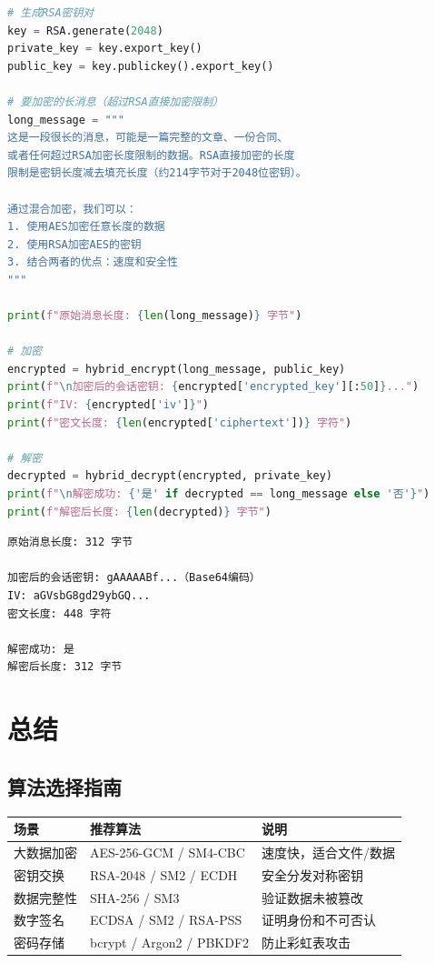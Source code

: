 \documentclass[12pt,a4paper]{article}
\begin{document}
\begin{lstlisting}[language=Python]
# 生成RSA密钥对
key = RSA.generate(2048)
private_key = key.export_key()
public_key = key.publickey().export_key()

# 要加密的长消息（超过RSA直接加密限制）
long_message = """
这是一段很长的消息，可能是一篇完整的文章、一份合同、
或者任何超过RSA加密长度限制的数据。RSA直接加密的长度
限制是密钥长度减去填充长度（约214字节对于2048位密钥）。

通过混合加密，我们可以：
1. 使用AES加密任意长度的数据
2. 使用RSA加密AES的密钥
3. 结合两者的优点：速度和安全性
"""

print(f"原始消息长度: {len(long_message)} 字节")

# 加密
encrypted = hybrid_encrypt(long_message, public_key)
print(f"\n加密后的会话密钥: {encrypted['encrypted_key'][:50]}...")
print(f"IV: {encrypted['iv']}")
print(f"密文长度: {len(encrypted['ciphertext'])} 字符")

# 解密
decrypted = hybrid_decrypt(encrypted, private_key)
print(f"\n解密成功: {'是' if decrypted == long_message else '否'}")
print(f"解密后长度: {len(decrypted)} 字节")
\end{lstlisting}

\begin{notebox}[运行结果]
\begin{verbatim}
原始消息长度: 312 字节

加密后的会话密钥: gAAAAABf...（Base64编码）
IV: aGVsbG8gd29ybGQ...
密文长度: 448 字符

解密成功: 是
解密后长度: 312 字节
\end{verbatim}
\end{notebox}

\section{总结}

\subsection{算法选择指南}

\begin{center}
\begin{tabular}{|l|l|l|}
\hline
\textbf{场景} & \textbf{推荐算法} & \textbf{说明} \\
\hline
大数据加密 & AES-256-GCM / SM4-CBC & 速度快，适合文件/数据 \\
\hline
密钥交换 & RSA-2048 / SM2 / ECDH & 安全分发对称密钥 \\
\hline
数据完整性 & SHA-256 / SM3 & 验证数据未被篡改 \\
\hline
数字签名 & ECDSA / SM2 / RSA-PSS & 证明身份和不可否认 \\
\hline
密码存储 & bcrypt / Argon2 / PBKDF2 & 防止彩虹表攻击 \\
\hline
\end{tabular}
\end{center}
\end{document}
